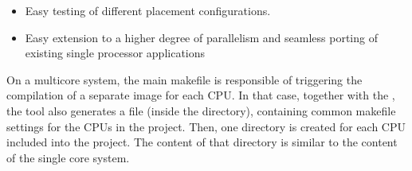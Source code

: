 \begin{itemize}
\item Easy testing of different placement configurations. 
\item Easy extension to a higher degree of parallelism and seamless
  porting of existing single processor applications
\end{itemize}

On a multicore system, the main makefile is responsible of triggering
the compilation of a separate image for each CPU. In that case,
together with the , the tool also generates a file
 (inside the  directory), containing
common makefile settings for the CPUs in the project. Then, one
directory is created for each CPU included into the project. The
content of that directory is similar to the content of the single core
system.

